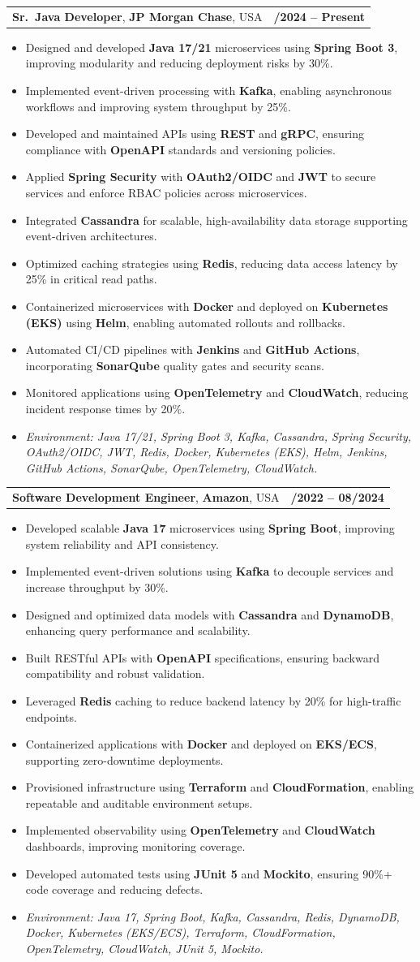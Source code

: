 \documentclass[letterpaper,11pt]{article}
\makeatletter
\newcommand{\resumeItem}[1]{
  \item\footnotesize{
    {#1 \vspace{-2pt}}
  }
}
\newcommand{\resumeSubheading}[4]{
  \vspace{-2pt}\item
    \begin{tabular*}{1.0\textwidth}[t]{l@{\extracolsep{\fill}}r}
      \textbf{\fontsize{10pt}{14pt}\selectfont #3}, \textbf{\fontsize{10pt}{14pt}\selectfont #1}, \fontsize{10pt}{14pt}\selectfont #4 & \textbf{\fontsize{10pt}{14pt}\selectfont #2} \\
    \end{tabular*}\vspace{-7pt}
}
\newcommand{\resumeItemListStart}{\begin{itemize}[leftmargin=*]}
\newcommand{\resumeItemListEnd}{\end{itemize}\vspace{-5pt}}
\makeatother
\begin{document}
\resumeSubheading
{JP Morgan Chase}{09/2024 -- Present}
{Sr.\ Java Developer}{USA}
\resumeItemListStart
  \resumeItem{Designed and developed \textbf{Java 17/21} microservices using \textbf{Spring Boot 3}, improving modularity and reducing deployment risks by 30\%.}
  \resumeItem{Implemented event-driven processing with \textbf{Kafka}, enabling asynchronous workflows and improving system throughput by 25\%.}
  \resumeItem{Developed and maintained APIs using \textbf{REST} and \textbf{gRPC}, ensuring compliance with \textbf{OpenAPI} standards and versioning policies.}
  \resumeItem{Applied \textbf{Spring Security} with \textbf{OAuth2/OIDC} and \textbf{JWT} to secure services and enforce RBAC policies across microservices.}
  \resumeItem{Integrated \textbf{Cassandra} for scalable, high-availability data storage supporting event-driven architectures.}
  \resumeItem{Optimized caching strategies using \textbf{Redis}, reducing data access latency by 25\% in critical read paths.}
  \resumeItem{Containerized microservices with \textbf{Docker} and deployed on \textbf{Kubernetes (EKS)} using \textbf{Helm}, enabling automated rollouts and rollbacks.}
  \resumeItem{Automated CI/CD pipelines with \textbf{Jenkins} and \textbf{GitHub Actions}, incorporating \textbf{SonarQube} quality gates and security scans.}
  \resumeItem{Monitored applications using \textbf{OpenTelemetry} and \textbf{CloudWatch}, reducing incident response times by 20\%.}
  \resumeItem{\textit{Environment: Java 17/21, Spring Boot 3, Kafka, Cassandra, Spring Security, OAuth2/OIDC, JWT, Redis, Docker, Kubernetes (EKS), Helm, Jenkins, GitHub Actions, SonarQube, OpenTelemetry, CloudWatch.}}
\resumeItemListEnd

\resumeSubheading
{Amazon}{10/2022 -- 08/2024}
{Software Development Engineer}{USA}
\resumeItemListStart
  \resumeItem{Developed scalable \textbf{Java 17} microservices using \textbf{Spring Boot}, improving system reliability and API consistency.}
  \resumeItem{Implemented event-driven solutions using \textbf{Kafka} to decouple services and increase throughput by 30\%.}
  \resumeItem{Designed and optimized data models with \textbf{Cassandra} and \textbf{DynamoDB}, enhancing query performance and scalability.}
  \resumeItem{Built RESTful APIs with \textbf{OpenAPI} specifications, ensuring backward compatibility and robust validation.}
  \resumeItem{Leveraged \textbf{Redis} caching to reduce backend latency by 20\% for high-traffic endpoints.}
  \resumeItem{Containerized applications with \textbf{Docker} and deployed on \textbf{EKS/ECS}, supporting zero-downtime deployments.}
  \resumeItem{Provisioned infrastructure using \textbf{Terraform} and \textbf{CloudFormation}, enabling repeatable and auditable environment setups.}
  \resumeItem{Implemented observability using \textbf{OpenTelemetry} and \textbf{CloudWatch} dashboards, improving monitoring coverage.}
  \resumeItem{Developed automated tests using \textbf{JUnit 5} and \textbf{Mockito}, ensuring 90\%+ code coverage and reducing defects.}
  \resumeItem{\textit{Environment: Java 17, Spring Boot, Kafka, Cassandra, Redis, DynamoDB, Docker, Kubernetes (EKS/ECS), Terraform, CloudFormation, OpenTelemetry, CloudWatch, JUnit 5, Mockito.}}
\resumeItemListEnd
\end{document}
